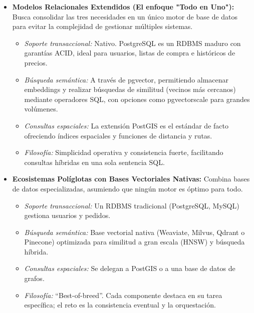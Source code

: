 \begin{tcolorbox}[colback=responsecolor, title=Insights de DeepSeek, colframe=gray!60!black, breakable]
	\begin{itemize}
		\item \textbf{Modelos Relacionales Extendidos (El enfoque "Todo en Uno"):} 
		Busca consolidar las tres necesidades en un único motor de base de datos para evitar la complejidad de gestionar múltiples sistemas.
		\begin{itemize}
			\item \textit{Soporte transaccional:} Nativo. PostgreSQL es un RDBMS maduro con garantías ACID, ideal para usuarios, listas de compra e históricos de precios.
			\item \textit{Búsqueda semántica:} A través de pgvector, permitiendo almacenar embeddings y realizar búsquedas de similitud (vecinos más cercanos) mediante operadores SQL, con opciones como pgvectorscale para grandes volúmenes.
			\item \textit{Consultas espaciales:} La extensión PostGIS es el estándar de facto ofreciendo índices espaciales y funciones de distancia y rutas.
			\item \textit{Filosofía:} Simplicidad operativa y consistencia fuerte, facilitando consultas híbridas en una sola sentencia SQL.
		\end{itemize}
		
		\item \textbf{Ecosistemas Políglotas con Bases Vectoriales Nativas:} 
		Combina bases de datos especializadas, asumiendo que ningún motor es óptimo para todo.
		\begin{itemize}
			\item \textit{Soporte transaccional:} Un RDBMS tradicional (PostgreSQL, MySQL) gestiona usuarios y pedidos.
			\item \textit{Búsqueda semántica:} Base vectorial nativa (Weaviate, Milvus, Qdrant o Pinecone) optimizada para similitud a gran escala (HNSW) y búsqueda híbrida.
			\item \textit{Consultas espaciales:} Se delegan a PostGIS o a una base de datos de grafos.
			\item \textit{Filosofía:} ``Best-of-breed''. Cada componente destaca en su tarea específica; el reto es la consistencia eventual y la orquestación.
		\end{itemize}
		

\end{itemize}
\end{tcolorbox}
